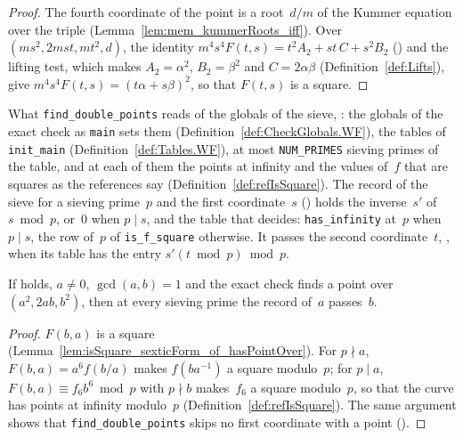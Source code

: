 \begin{proof}
  \leanok
  The fourth coordinate of the point is a root~$d/m$ of the Kummer equation over the triple
  (Lemma~\ref{lem:mem_kummerRoots_iff}). Over $(m s^2, 2 m s t, m t^2, d)$, the identity
  $m^4 s^4 F(t, s) = t^2 A_2 + s t\, C + s^2 B_2$
  () and the lifting test, which makes
  $A_2 = \alpha^2$, $B_2 = \beta^2$ and $C = 2 \alpha \beta$ (Definition~\ref{def:Lifts}), give
  $m^4 s^4 F(t, s) = (t \alpha + s \beta)^2$, so that $F(t, s)$ is a square.
\end{proof}

\begin{definition}\label{def:DoubleSetup}
  \leanok
  What \texttt{find\_double\_points} reads of the globals of the sieve,
  : the globals of the exact check as \texttt{main} sets them
  (Definition~\ref{def:CheckGlobals.WF}), the tables of \texttt{init\_main}
  (Definition~\ref{def:Tables.WF}), at most \texttt{NUM\_PRIMES} sieving primes of the table, and
  at each of them the points at infinity and the values of~$f$ that are squares as the references
  say (Definition~\ref{def:refIsSquare}). The record of the sieve for a sieving prime~$p$ and the
  first coordinate~$s$ () holds the inverse~$s'$ of $s \bmod p$,
  or~$0$ when $p \mid s$, and the table that decides: \texttt{has\_infinity} at~$p$ when
  $p \mid s$, the row of~$p$ of \texttt{is\_f\_square} otherwise. It passes the second
  coordinate~$t$, , when its table has the entry
  $s' (t \bmod p) \bmod p$.
\end{definition}

\begin{lemma}\label{lem:DoubleSetup.passes_of_points_ne_nil}
  \leanok
  If  holds, $a \ne 0$, $\gcd(a, b) = 1$ and the exact check finds a
  point over $(a^2, 2 a b, b^2)$, then at every sieving prime the record of~$a$ passes~$b$.
\end{lemma}

\begin{proof}
  \leanok
  $F(b, a)$ is a square (Lemma~\ref{lem:isSquare_sexticForm_of_hasPointOver}). For $p \nmid a$,
  $F(b, a) = a^6 f(b/a)$ makes $f(b a^{-1})$ a square modulo~$p$; for $p \mid a$,
  $F(b, a) \equiv f_6 b^6 \bmod p$ with $p \nmid b$ makes~$f_6$ a square modulo~$p$, so that the
  curve has points at infinity modulo~$p$ (Definition~\ref{def:refIsSquare}). The same argument
  shows that \texttt{find\_double\_points} skips no first coordinate with a point
  ().
\end{proof}

